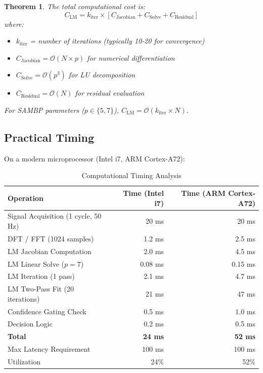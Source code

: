 \documentclass[12pt,a4paper]{article}
\newtheorem{theorem}{Theorem}[section]
\begin{document}
\begin{theorem}
\label{thm:complexity}
The total computational cost is:
\begin{equation}
C_{\text{LM}} = k_{\text{iter}} \times [C_{\text{Jacobian}} + C_{\text{Solve}} + C_{\text{Residual}}]
\end{equation}
where:
\begin{itemize}
    \item $k_{\text{iter}}$ = number of iterations (typically 10-20 for convergence)
    \item $C_{\text{Jacobian}} = \mathcal{O}(N \times p)$ for numerical differentiation
    \item $C_{\text{Solve}} = \mathcal{O}(p^3)$ for LU decomposition
    \item $C_{\text{Residual}} = \mathcal{O}(N)$ for residual evaluation
\end{itemize}

For SAMBP parameters ($p \in \{5, 7\}$), $C_{\text{LM}} = \mathcal{O}(k_{\text{iter}} \times N)$.
\end{theorem}

\subsection{Practical Timing}
\label{subsec:practical_timing}

On a modern microprocessor (Intel i7, ARM Cortex-A72):

\begin{table}[H]
\centering
\caption{Computational Timing Analysis}
\label{tab:timing}
\begin{tabular}{lrr}
\toprule
\textbf{Operation} & \textbf{Time (Intel i7)} & \textbf{Time (ARM Cortex-A72)} \\
\midrule
Signal Acquisition (1 cycle, 50 Hz) & 20 ms & 20 ms \\
DFT / FFT (1024 samples) & 1.2 ms & 2.5 ms \\
LM Jacobian Computation & 2.0 ms & 4.5 ms \\
LM Linear Solve ($p=7$) & 0.08 ms & 0.15 ms \\
LM Iteration (1 pass) & 2.1 ms & 4.7 ms \\
LM Two-Pass Fit (20 iterations) & 21 ms & 47 ms \\
Confidence Gating Check & 0.5 ms & 1.0 ms \\
Decision Logic & 0.2 ms & 0.5 ms \\
\midrule
\textbf{Total} & \textbf{~24 ms} & \textbf{~52 ms} \\
\midrule
Max Latency Requirement & 100 ms & 100 ms \\
Utilization & 24\% & 52\% \\
\bottomrule
\end{tabular}
\end{table}
\end{document}
